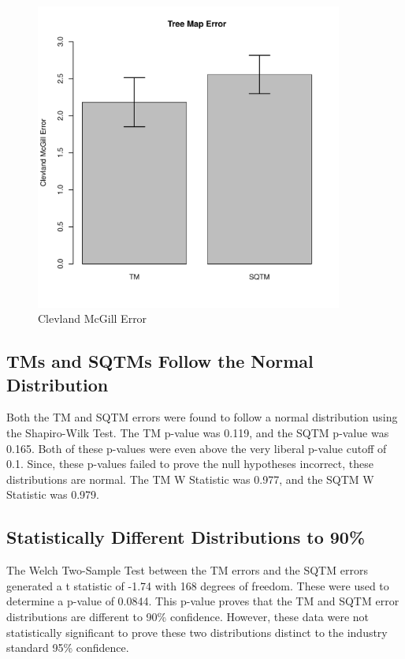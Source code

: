 \documentclass{article}
\begin{document}
\begin{figure}
\includegraphics[width=0.9\textwidth]{mapsBarPlot.pdf}
\caption{Clevland McGill Error}
\end{figure}

\subsection*{TMs and SQTMs Follow the Normal Distribution}
Both the TM and SQTM errors were found to follow a normal distribution using the Shapiro-Wilk Test. The TM p-value was 0.119, and the SQTM p-value was 0.165. Both of these p-values were even above the very liberal p-value cutoff of 0.1. Since, these
p-values failed to prove the null hypotheses incorrect, these distributions are normal. The TM W Statistic was 0.977, and the SQTM W Statistic was 0.979.

\subsection*{Statistically Different Distributions to 90\%}
The Welch Two-Sample Test between the TM errors and the SQTM errors generated a t statistic of -1.74 with 168 degrees of freedom. These were used to determine a p-value of 0.0844. This p-value proves that the TM and SQTM error distributions are
different to 90\% confidence. However, these data were not statistically significant to prove these two distributions distinct to the
industry standard 95\% confidence. 
\end{document}

